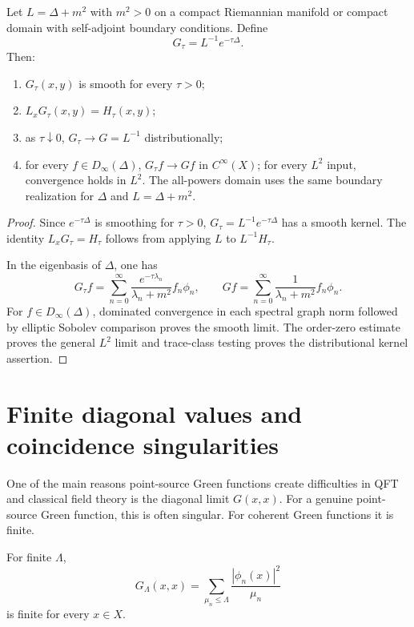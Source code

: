 \documentclass[11pt]{article}
\begin{document}
\begin{theorem}
Let \(L=\Delta+m^2\) with \(m^2>0\) on a compact Riemannian manifold or compact domain with self-adjoint boundary conditions. Define
\[
G_\tau=L^{-1}e^{-\tau\Delta}.
\]
Then:
\begin{enumerate}
\item \(G_\tau(x,y)\) is smooth for every \(\tau>0\);
\item \(L_xG_\tau(x,y)=H_\tau(x,y)\);
\item as \(\tau\downarrow0\), \(G_\tau\to G=L^{-1}\) distributionally;
\item for every \(f\in D_\infty(\Delta)\), \(G_\tau f\to Gf\) in
\(C^\infty(X)\); for every \(L^2\) input, convergence holds in \(L^2\).
The all-powers domain uses the same boundary realization for \(\Delta\)
and \(L=\Delta+m^2\).
\end{enumerate}
\end{theorem}

\begin{proof}
Since \(e^{-\tau\Delta}\) is smoothing for \(\tau>0\), \(G_\tau=L^{-1}e^{-\tau\Delta}\) has a smooth kernel. The identity \(L_xG_\tau=H_\tau\) follows from applying \(L\) to \(L^{-1}H_\tau\).

In the eigenbasis of \(\Delta\), one has
\[
G_\tau f=\sum_{n=0}^\infty \frac{e^{-\tau\lambda_n}}{\lambda_n+m^2} f_n\phi_n,
\qquad
Gf=\sum_{n=0}^\infty \frac{1}{\lambda_n+m^2} f_n\phi_n.
\]
For \(f\in D_\infty(\Delta)\), dominated convergence in each spectral
graph norm followed by elliptic Sobolev comparison proves the smooth
limit. The order-zero estimate proves the general \(L^2\) limit and
trace-class testing proves the distributional kernel assertion.
\end{proof}

\section{Finite diagonal values and coincidence singularities}

One of the main reasons point-source Green functions create difficulties in QFT and classical field theory is the diagonal limit \(G(x,x)\). For a genuine point-source Green function, this is often singular. For coherent Green functions it is finite.

\begin{proposition}
For finite \(\Lambda\),
\begin{equation}
G_\Lambda(x,x)=\sum_{\mu_n\le\Lambda}\frac{|\phi_n(x)|^2}{\mu_n}
\end{equation}
is finite for every \(x\in X\).
\end{proposition}
\end{document}
